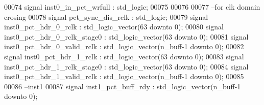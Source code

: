 \begin{DoxyCode}
00074 \textcolor{keywordflow}{signal} \textcolor{vhdlchar}{inst0_in_pct_wrfull}    \textcolor{vhdlchar}{:} \textcolor{comment}{std\_logic};
00075 
00076 
00077 \textcolor{keyword}{--for clk domain crosing}
00078 \textcolor{keywordflow}{signal} \textcolor{vhdlchar}{pct_sync_dis_rclk}            \textcolor{vhdlchar}{:} \textcolor{comment}{std\_logic};
00079 \textcolor{keywordflow}{signal} \textcolor{vhdlchar}{inst0_pct_hdr_0_rclk}         \textcolor{vhdlchar}{:} \textcolor{comment}{std\_logic\_vector}\textcolor{vhdlchar}{(}\textcolor{vhdllogic}{}\textcolor{vhdllogic}{63} \textcolor{keywordflow}{downto} \textcolor{vhdllogic}{}\textcolor{vhdllogic}{0}\textcolor{vhdlchar}{)};
00080 \textcolor{keywordflow}{signal} \textcolor{vhdlchar}{inst0_pct_hdr_0_rclk_stage0}  \textcolor{vhdlchar}{:} \textcolor{comment}{std\_logic\_vector}\textcolor{vhdlchar}{(}\textcolor{vhdllogic}{}\textcolor{vhdllogic}{63} \textcolor{keywordflow}{downto} \textcolor{vhdllogic}{}\textcolor{vhdllogic}{0}\textcolor{vhdlchar}{)};
00081 \textcolor{keywordflow}{signal} \textcolor{vhdlchar}{inst0_pct_hdr_0_valid_rclk}   \textcolor{vhdlchar}{:} \textcolor{comment}{std\_logic\_vector}\textcolor{vhdlchar}{(}\textcolor{vhdlchar}{n_buff}\textcolor{vhdlchar}{-}\textcolor{vhdllogic}{}\textcolor{vhdllogic}{1} \textcolor{keywordflow}{downto} \textcolor{vhdllogic}{}\textcolor{vhdllogic}{0}\textcolor{vhdlchar}{)};
00082 \textcolor{keywordflow}{signal} \textcolor{vhdlchar}{inst0_pct_hdr_1_rclk}         \textcolor{vhdlchar}{:} \textcolor{comment}{std\_logic\_vector}\textcolor{vhdlchar}{(}\textcolor{vhdllogic}{}\textcolor{vhdllogic}{63} \textcolor{keywordflow}{downto} \textcolor{vhdllogic}{}\textcolor{vhdllogic}{0}\textcolor{vhdlchar}{)};
00083 \textcolor{keywordflow}{signal} \textcolor{vhdlchar}{inst0_pct_hdr_1_rclk_stage0}  \textcolor{vhdlchar}{:} \textcolor{comment}{std\_logic\_vector}\textcolor{vhdlchar}{(}\textcolor{vhdllogic}{}\textcolor{vhdllogic}{63} \textcolor{keywordflow}{downto} \textcolor{vhdllogic}{}\textcolor{vhdllogic}{0}\textcolor{vhdlchar}{)};
00084 \textcolor{keywordflow}{signal} \textcolor{vhdlchar}{inst0_pct_hdr_1_valid_rclk}   \textcolor{vhdlchar}{:} \textcolor{comment}{std\_logic\_vector}\textcolor{vhdlchar}{(}\textcolor{vhdlchar}{n_buff}\textcolor{vhdlchar}{-}\textcolor{vhdllogic}{}\textcolor{vhdllogic}{1} \textcolor{keywordflow}{downto} \textcolor{vhdllogic}{}\textcolor{vhdllogic}{0}\textcolor{vhdlchar}{)};
00085 
00086 \textcolor{keyword}{--inst1}
00087 \textcolor{keywordflow}{signal} \textcolor{vhdlchar}{inst1_pct_buff_rdy}           \textcolor{vhdlchar}{:} \textcolor{comment}{std\_logic\_vector}\textcolor{vhdlchar}{(}\textcolor{vhdlchar}{n_buff}\textcolor{vhdlchar}{-}\textcolor{vhdllogic}{}\textcolor{vhdllogic}{1} \textcolor{keywordflow}{downto} \textcolor{vhdllogic}{}\textcolor{vhdllogic}{0}\textcolor{vhdlchar}{)};

\end{DoxyCode}
